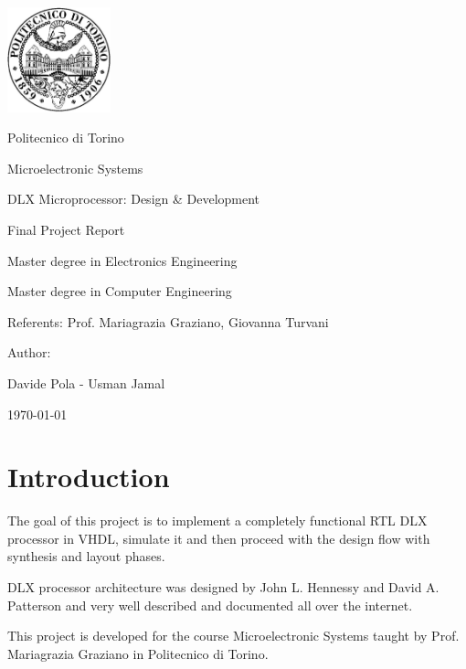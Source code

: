 \documentclass[12pt]{article}
\begin{document}
\begin{titlepage}
	\centerline{
		\includegraphics[width=3cm]{images/logopoli.eps}} 
	\vspace{0.5cm}
	\centerline{\LARGE Politecnico di Torino}
	\vspace{1.5cm}
	\centerline{\huge\sf Microelectronic Systems}
	\vspace{1cm}
	\centerline{\Huge\sf DLX Microprocessor: Design \& Development}
	\bigskip
	\centerline{\huge\sf Final Project Report}
	\vspace{2cm}
	\centerline{\Large Master degree in Electronics Engineering}
	\bigskip
	\centerline{\Large Master degree in Computer Engineering}
	\vspace{1.5cm}
	\centerline{\large Referents: Prof. Mariagrazia Graziano, Giovanna Turvani}
	\vspace{0.75cm}
	\centerline{\large Author:}
	\bigskip
	\centerline{\large Davide Pola - Usman Jamal}
	\vspace{2cm}
	\centerline{\large \today}
\end{titlepage}

\tableofcontents
\newpage
\section{Introduction}
The goal of this project is to implement a completely functional RTL DLX processor in VHDL, simulate it and then proceed with the design flow with synthesis and layout phases.

DLX processor architecture was designed by John L. Hennessy and David A. Patterson\cite{Patterson:1990:CAQ:77493} and very well described and documented all over the internet.

This project is developed for the course Microelectronic Systems taught by Prof. Mariagrazia Graziano in Politecnico di Torino\cite{MGLECTURENOTES}.
\end{document}
